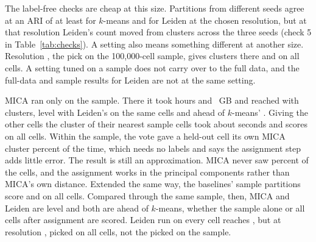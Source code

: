 The label-free checks are cheap at this size. Partitions from different seeds agree at an ARI of at least
 for $k$-means and  for Leiden at the chosen
resolution, but at that resolution Leiden's count moved from  clusters across the
three seeds (check 5 in Table~\ref{tab:checks}). A setting also means something different at another size.
Resolution , the pick on the 100,000-cell sample, gives 
clusters there and  on all cells. A setting tuned on a sample does not carry
over to the full data, and the full-data and sample results for Leiden are not at the same setting.

MICA ran only on the sample. There it took  hours and ~GB and
reached  with  clusters, level with Leiden's
 on the same cells and ahead of $k$-means' . Giving
the other  cells the cluster of their nearest sample cells took about
 seconds and scores  on all cells. Within the sample, the
vote gave a held-out cell its own MICA cluster  percent of the time, which needs
no labels and says the assignment step adds little error. The result is still an approximation. MICA
never saw  percent of the cells, and the assignment works in the principal components
rather than MICA's own distance. Extended the same way, the baselines' sample partitions score
 and  on all cells. Compared through the same
sample, then, MICA and Leiden are level and both are ahead of $k$-means, whether the sample alone or all
cells after assignment are scored. Leiden run on every cell reaches , but at
resolution , picked on all cells, not the  picked on the sample.

